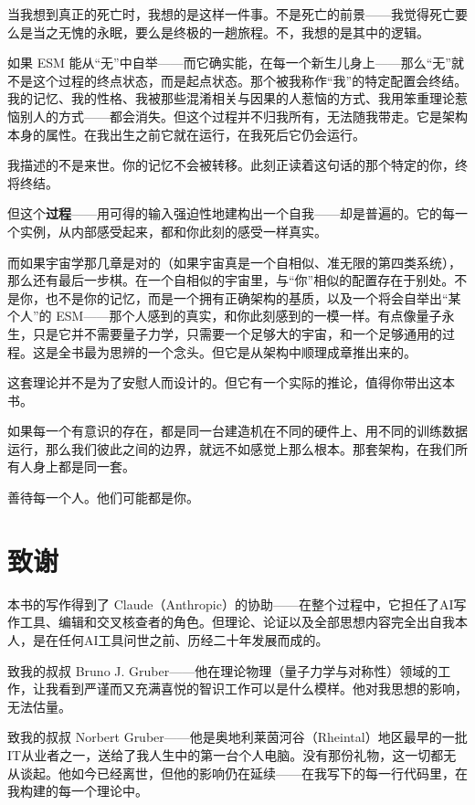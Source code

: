 \documentclass[11pt, twoside, openright]{book}
\begin{document}
当我想到真正的死亡时，我想的是这样一件事。不是死亡的前景------我觉得死亡要么是当之无愧的永眠，要么是终极的一趟旅程。不，我想的是其中的逻辑。

如果 ESM 能从“无”中自举------而它确实能，在每一个新生儿身上------那么“无”就不是这个过程的终点状态，而是起点状态。那个被我称作“我”的特定配置会终结。我的记忆、我的性格、我被那些混淆相关与因果的人惹恼的方式、我用笨重理论惹恼别人的方式------都会消失。但这个过程并不归我所有，无法随我带走。它是架构本身的属性。在我出生之前它就在运行，在我死后它仍会运行。

我描述的不是来世。你的记忆不会被转移。此刻正读着这句话的那个特定的你，终将终结。

但这个\textbf{过程}------用可得的输入强迫性地建构出一个自我------却是普遍的。它的每一个实例，从内部感受起来，都和你此刻的感受一样真实。

而如果宇宙学那几章是对的（如果宇宙真是一个自相似、准无限的第四类系统），那么还有最后一步棋。在一个自相似的宇宙里，与“你”相似的配置存在于别处。不是你，也不是你的记忆，而是一个拥有正确架构的基质，以及一个将会自举出“某个人”的 ESM------那个人感到的真实，和你此刻感到的一模一样。有点像量子永生，只是它并不需要量子力学，只需要一个足够大的宇宙，和一个足够通用的过程。这是全书最为思辨的一个念头。但它是从架构中顺理成章推出来的。

这套理论并不是为了安慰人而设计的。但它有一个实际的推论，值得你带出这本书。

如果每一个有意识的存在，都是同一台建造机在不同的硬件上、用不同的训练数据运行，那么我们彼此之间的边界，就远不如感觉上那么根本。那套架构，在我们所有人身上都是同一套。

善待每一个人。他们可能都是你。


\chapter*{致谢}

本书的写作得到了 Claude（Anthropic）的协助------在整个过程中，它担任了AI写作工具、编辑和交叉核查者的角色。但理论、论证以及全部思想内容完全出自我本人，是在任何AI工具问世之前、历经二十年发展而成的。

致我的叔叔 Bruno J. Gruber------他在理论物理（量子力学与对称性）领域的工作，让我看到严谨而又充满喜悦的智识工作可以是什么模样。他对我思想的影响，无法估量。

致我的叔叔 Norbert Gruber------他是奥地利莱茵河谷（Rheintal）地区最早的一批IT从业者之一，送给了我人生中的第一台个人电脑。没有那份礼物，这一切都无从谈起。他如今已经离世，但他的影响仍在延续------在我写下的每一行代码里，在我构建的每一个理论中。
\end{document}
